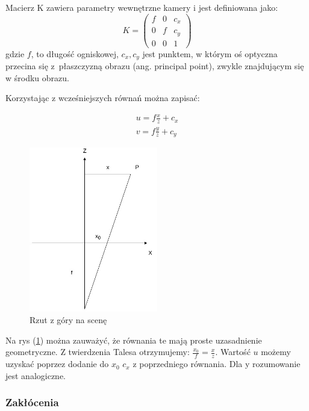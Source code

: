 \documentclass[oneside, eng]{mgr}
\begin{document}
Macierz K zawiera parametry wewnętrzne kamery i jest definiowana jako:
\begin{equation}
	K = \left( \begin{array}{lll}
		f & 0 & c_x \\
		0 & f & c_y \\
		0 & 0 & 1
	\end{array} \right)
\end{equation}
gdzie $f$, to długość ogniskowej, $c_x, c_y$ jest punktem, w którym oś optyczna przecina się z~płaszczyzną obrazu (ang. principal point), zwykle znajdującym się w środku obrazu.

Korzystając z wcześniejszych równań można zapisać:

\begin{align*}
	u = f \frac{x}{z} + c_x \\
	v = f \frac{y}{z} + c_y
\end{align*}

\begin{figure}
\centering
	\includegraphics[width=0.50\textwidth]{rzutowanie.jpg}\par\vspace{1cm}
\caption{Rzut z góry na scenę}
	\label{fig:projection_up}
\end{figure}

Na rys (\ref{fig:projection_up}) można zauważyć, że równania te mają proste uzasadnienie geometryczne. Z twierdzenia Talesa otrzymujemy: 
$\frac{x_0}{f} = \frac{x}{z}$. Wartość $u$ możemy uzyskać poprzez dodanie do $x_0$ $c_x$ z poprzedniego równania. Dla y rozumowanie jest analogiczne.


\subsubsection{Zakłócenia}
\end{document}
